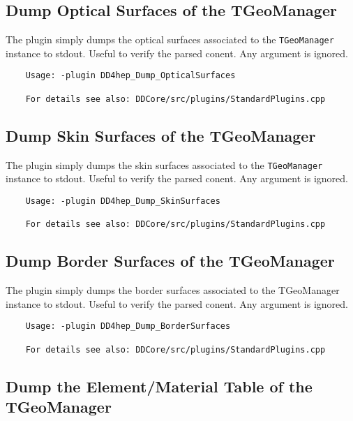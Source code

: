 \subsection{Dump Optical Surfaces of the TGeoManager}
\label{sec:dd4hep-manual-plugin-dump-optical-surfaces}

The plugin simply dumps the optical surfaces associated to the \texttt{TGeoManager} instance to stdout.
Useful to verify the parsed conent.
Any argument is ignored.
\begin{verbatim}
    Usage: -plugin DD4hep_Dump_OpticalSurfaces

    For details see also: DDCore/src/plugins/StandardPlugins.cpp
\end{verbatim}

\subsection{Dump Skin Surfaces of the TGeoManager}
\label{sec:dd4hep-manual-plugin-dump-skin-surfaces}

The plugin simply dumps the skin surfaces associated to the \texttt{TGeoManager} instance to stdout.
Useful to verify the parsed conent.
Any argument is ignored.
\begin{verbatim}
    Usage: -plugin DD4hep_Dump_SkinSurfaces

    For details see also: DDCore/src/plugins/StandardPlugins.cpp
\end{verbatim}

\subsection{Dump Border Surfaces of the TGeoManager}
\label{sec:dd4hep-manual-plugin-dump-border-surfaces}

The plugin simply dumps the border surfaces associated to the TGeoManager instance to stdout.
Useful to verify the parsed conent.
Any argument is ignored.
\begin{verbatim}
    Usage: -plugin DD4hep_Dump_BorderSurfaces

    For details see also: DDCore/src/plugins/StandardPlugins.cpp
\end{verbatim}

\subsection{Dump the Element/Material Table of the TGeoManager}
\label{sec:dd4hep-manual-plugin-dump-material-table}

